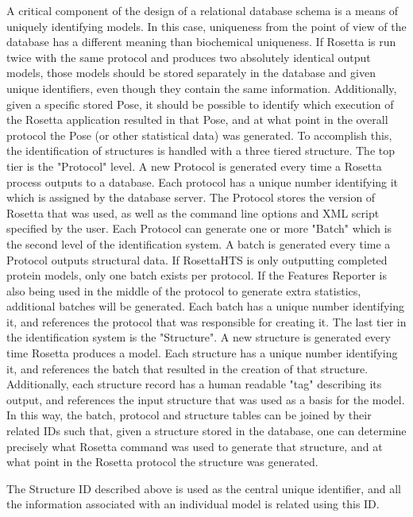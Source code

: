 A critical component of the design of a relational database schema is a means of uniquely identifying models.
In this case, uniqueness from the point of view of the database has a different meaning than biochemical uniqueness.
If Rosetta is run twice with the same protocol and produces two absolutely identical output models, those models should be stored separately in the database and given unique identifiers, even though they contain the same information. 
Additionally, given a specific stored Pose, it should be possible to identify which execution of the Rosetta application resulted in that Pose, and at what point in the overall protocol the Pose (or other statistical data) was generated. 
To accomplish this, the identification of structures is handled with a three tiered structure.
The top tier is the "Protocol" level.
A new Protocol is generated every time a Rosetta process outputs to a database.
Each protocol has a unique number identifying it which is assigned by the database server.
The Protocol stores the version of Rosetta that was used, as well as the command line options and XML script specified by the user.
Each Protocol can generate one or more "Batch" which is the second level of the identification system.
A batch is generated every time a Protocol outputs structural data. If RosettaHTS is only outputting completed protein models, only one batch exists per protocol.
If the Features Reporter is also being used in the middle of the protocol to generate extra statistics, additional batches will be generated. 
Each batch has a unique number identifying it, and references the protocol that was responsible for creating it.
The last tier in the identification system is the "Structure".
A new structure is generated every time Rosetta produces a model.
Each structure has a unique number identifying it, and references the batch that resulted in the creation of that structure.
Additionally, each structure record has a human readable "tag" describing its output, and references the input structure that was used as a basis for the model. 
In this way, the batch, protocol and structure tables can be joined by their related IDs such that, given a structure stored in the database, one can determine precisely what Rosetta command was used to generate that structure, and at what point in the Rosetta protocol the structure was generated. 

The Structure ID described above is used as the central unique identifier, and all the information associated with an individual model is related using this ID.


